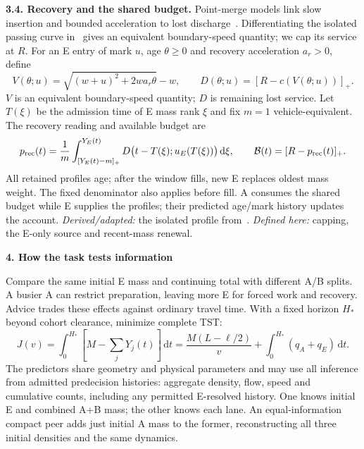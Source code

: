 \documentclass[10pt,a4paper]{article}
\newcommand{\pos}[1]{[#1]_+}
\newcommand{\bud}{\mathcal B}
\newcommand{\dd}{\,\mathrm d}
\newcommand{\head}[1]{\par\vspace{4pt}\noindent\textbf{#1}\par\nobreak\vspace{1pt}}
\begin{document}
\textbf{3.4. Recovery and the shared budget.}
Point-merge models link slow insertion and bounded acceleration to lost
discharge~\cite{leclercq2011,leclercq}. Differentiating the isolated passing
curve in~\cite{leclercq} gives an equivalent boundary-speed quantity;
we cap its service at $R$. For an E entry of mark $u$, age $\theta\geq0$
and recovery acceleration $a_r>0$, define
\begin{equation}
 V(\theta;u)=\sqrt{(w+u)^2+2wa_r\theta}-w,\qquad
 D(\theta;u)=\pos{R-c(V(\theta;u))}.
 \label{eq:profile}
\end{equation}
$V$ is an equivalent boundary-speed quantity; $D$ is remaining lost service.
Let $T(\xi)$ be the admission time of E mass rank $\xi$ and fix
$m=1$ vehicle-equivalent. The recovery reading and available budget are
\begin{equation}
 p_{\rm rec}(t)=\frac1m\int_{\pos{Y_E(t)-m}}^{Y_E(t)}
 D\bigl(t-T(\xi);u_E(T(\xi))\bigr)\dd\xi,\qquad
 \bud(t)=\pos{R-p_{\rm rec}(t)}.
 \label{eq:recovery}
\end{equation}
All retained profiles age; after the window fills, new E replaces oldest
mass weight. The fixed denominator also applies before fill. A consumes the
shared budget while E supplies the profiles; their predicted age/mark history
updates the account. \emph{Derived/adapted:} the isolated profile from~\cite{leclercq}.
\emph{Defined here:} capping, the E-only source and recent-mass renewal.

\head{4. How the task tests information}
Compare the same initial E mass and continuing total with different A/B
splits. A busier A can restrict preparation, leaving more E for forced work
and recovery. Advice trades these effects against ordinary travel time.
With a fixed horizon $H_*$ beyond cohort clearance, minimize complete TST:
\begin{equation}
 J(v)=\int_0^{H_*}\!\left[M-\sum_jY_j(t)\right]\dd t
 =\frac{M(L-\ell/2)}v+\int_0^{H_*}(q_A+q_E)\dd t.
 \label{eq:objective}
\end{equation}
The predictors share geometry and physical parameters and may use all
inference from admitted predecision histories: aggregate density, flow,
speed and cumulative counts, including any permitted E-resolved history.
One knows initial E and combined A+B mass; the other knows each lane.
An equal-information compact peer adds just initial A mass to the former,
reconstructing all three initial densities and the same dynamics.
\end{document}
